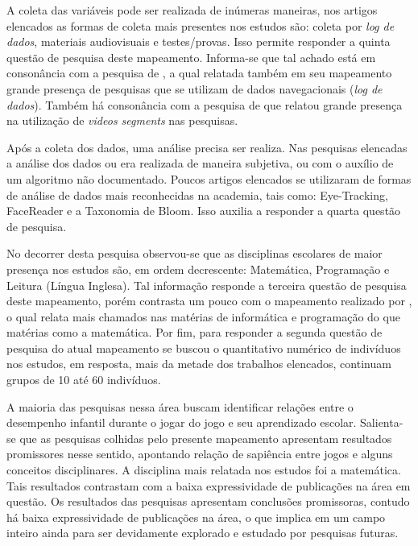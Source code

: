 \documentclass[12pt]{article}
\begin{document}
A coleta das variáveis pode ser realizada de inúmeras maneiras, nos artigos elencados as formas de coleta mais presentes nos estudos são: coleta por \textit{log de dados}, materiais audiovisuais e testes/provas. Isso permite responder a quinta questão de pesquisa deste mapeamento. Informa-se que tal achado está em consonância com a pesquisa de , a qual relatada também em seu mapeamento grande presença de pesquisas que se utilizam de dados navegacionais (\textit{log de dados}). Também há consonância com a pesquisa de  que relatou grande presença na utilização de \textit{videos segments} nas pesquisas.

Após a coleta dos dados, uma análise precisa ser realiza. Nas pesquisas elencadas a análise dos dados ou era realizada de maneira subjetiva, ou com o auxílio de um algoritmo não documentado. Poucos artigos elencados se utilizaram de formas de análise de dados mais reconhecidas na academia, tais como: Eye-Tracking, FaceReader e a Taxonomia de Bloom. Isso auxilia a responder a quarta questão de pesquisa. 

No decorrer desta pesquisa observou-se que as disciplinas escolares de maior presença nos estudos são, em ordem decrescente: Matemática, Programação e Leitura (Língua Inglesa). Tal informação responde a terceira questão de pesquisa deste mapeamento, porém contrasta um pouco com o mapeamento realizado por , o qual relata mais chamados nas matérias de informática e programação do que matérias como a matemática. Por fim, para responder a segunda questão de pesquisa do atual mapeamento se buscou o quantitativo numérico de indivíduos nos estudos, em resposta, mais da metade dos trabalhos elencados, continuam grupos de 10 até 60 indivíduos. 

A maioria das pesquisas nessa área buscam identificar relações entre o desempenho infantil durante o jogar do jogo e seu aprendizado escolar. Salienta-se que as pesquisas colhidas pelo presente mapeamento apresentam resultados promissores nesse sentido, apontando relação de sapiência entre jogos e alguns conceitos disciplinares. A disciplina mais relatada nos estudos foi a matemática. Tais resultados contrastam com a baixa expressividade de publicações na área em questão. Os resultados das pesquisas apresentam conclusões promissoras, contudo há baixa expressividade de publicações na área, o que implica em um campo inteiro ainda para ser devidamente explorado e estudado por pesquisas futuras. 
\end{document}
